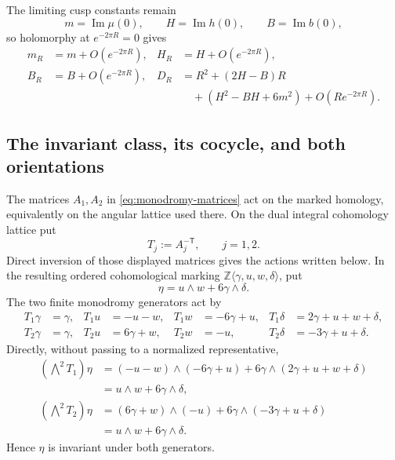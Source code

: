 The limiting cusp constants remain
\begin{equation}
 m=\operatorname{Im}\mu(0),\qquad
 H=\operatorname{Im}h(0),\qquad
 B=\operatorname{Im}b(0),
 \label{cusp-native-full-flux-limiting-constants}
\end{equation}
so holomorphy at \(e^{-2\pi R}=0\) gives
\begin{equation}
 \begin{aligned}
 m_R&=m+O(e^{-2\pi R}),&
 H_R&=H+O(e^{-2\pi R}),\\
 B_R&=B+O(e^{-2\pi R}),&
 D_R&=R^2+(2H-B)R\\
 &&&\quad +(H^2-BH+6m^2)+O(Re^{-2\pi R}).
 \end{aligned}
 \label{cusp-native-full-flux-cusp-expansions}
\end{equation}

\subsection{The invariant class, its cocycle, and both orientations}

The matrices \(A_1,A_2\) in \eqref{eq:monodromy-matrices} act on the marked
homology, equivalently on the angular lattice used there.  On the dual
integral cohomology lattice put
\begin{equation}
 T_j:=A_j^{-\mathsf T},\qquad j=1,2.
 \label{cusp-native-full-flux-dual-monodromy}
\end{equation}
Direct inversion of those displayed matrices gives the actions written
below.  In the resulting ordered cohomological marking
\(\mathbb Z\langle\gamma,u,w,\delta\rangle\), put
\begin{equation}
 \eta=u\wedge w+6\gamma\wedge\delta.
 \label{cusp-native-full-flux-class}
\end{equation}
The two finite monodromy generators act by
\begin{align*}
T_1\gamma&=\gamma,&T_1u&=-u-w,&
T_1w&=-6\gamma+u,&T_1\delta&=2\gamma+u+w+\delta,\\
T_2\gamma&=\gamma,&T_2u&=6\gamma+w,&
T_2w&=-u,&T_2\delta&=-3\gamma+u+\delta.
\end{align*}
Directly, without passing to a normalized representative,
\begin{align*}
(\bigwedge^2T_1)\eta
&=(-u-w)\wedge(-6\gamma+u)
 +6\gamma\wedge(2\gamma+u+w+\delta)\\
&=u\wedge w+6\gamma\wedge\delta,\\
(\bigwedge^2T_2)\eta
&=(6\gamma+w)\wedge(-u)
 +6\gamma\wedge(-3\gamma+u+\delta)\\
&=u\wedge w+6\gamma\wedge\delta.
\end{align*}
Hence \(\eta\) is invariant under both generators.

